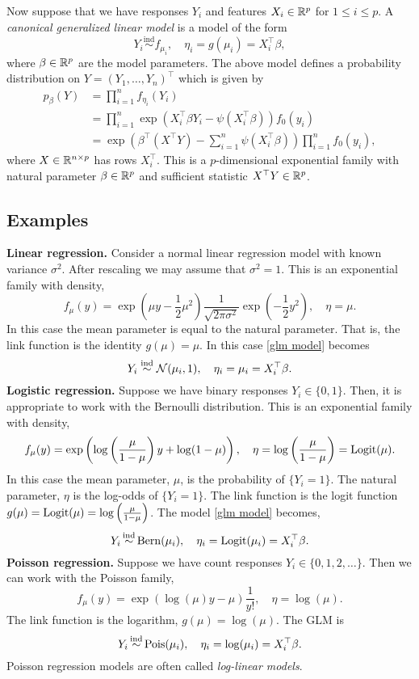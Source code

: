 Now suppose that we have responses $Y_i$ and features $X_i \in \mathbb{R}^p$ for $1\le i \le p$. A \emph{canonical generalized linear model} is a model of the form
\begin{equation}\label{glm model}Y_i \stackrel{\mathrm{ind}}{\sim} f_{\mu_i}, \quad \eta_i=g(\mu_i)= X_i^\top \beta, \end{equation}
where $\beta \in \mathbb{R}^p$ are the model parameters. The above model defines a probability distribution on $Y = (Y_1,\ldots,Y_n)^\top$ which is given by
\begin{align*}
    p_\beta(Y) &= \prod_{i=1}^n f_{\eta_i}(Y_i)\\
    &=\prod_{i=1}^n \exp\left(X_i^\top \beta Y_i - \psi\left(X_i^\top \beta\right)\right) f_0(y_i)\\
    &=\exp\left(\beta^\top (X^\top Y) - \sum_{i=1}^n \psi\left(X_i^\top \beta\right)\right)\prod_{i=1}^n f_0(y_i),
\end{align*}
where $X \in \mathbb{R}^{n \times p}$ has rows $X_i^\top$. This is a $p$-dimensional exponential family with natural parameter $\beta \in \mathbb{R}^p$ and sufficient statistic $X^\top Y \in \mathbb{R}^p$. 

\subsection{Examples} 

{\bf{Linear regression.}} Consider a normal linear regression model with known variance $\sigma^2$. After rescaling we may assume that $\sigma^2 = 1$. This is an exponential family with density,
\[f_\mu(y) = \exp\left(\mu y -\frac{1}{2}\mu^2\right)\frac{1}{\sqrt{2\pi \sigma^2}}\exp\left(-\frac{1}{2}y^2\right), \quad \eta = \mu. \]
In this case the mean parameter is equal to the natural parameter. That is, the link function is the identity $g(\mu) = \mu$. In this case \eqref{glm model} becomes
\[
    Y_i \stackrel{\mathrm{ind}}{\sim} {\mathcal N}(\mu_i, 1), \quad \eta_i = \mu_i = X_i^\top \beta.    
\]
{\bf{Logistic regression.}} Suppose we have binary responses $Y_i \in \{0,1\}$. Then, it is appropriate to work with the Bernoulli distribution. This is an exponential family with density,
\[f_\mu(y) = \exp\left(\log\left(\frac{\mu}{1-\mu}\right)y+\log(1-\mu)\right), \quad \eta = \log\left(\frac{\mu}{1-\mu}\right) = \mathrm{Logit}(\mu).  \]
In this case the mean parameter, $\mu$, is the probability of $\{Y_i=1\}$. The natural parameter, $\eta$ is the log-odds of $\{Y_i = 1\}$. The link function is the logit function $g(\mu) = \mathrm{Logit}(\mu) = \log\left(\frac{\mu}{1-\mu}\right)$. The model \eqref{glm model} becomes,
\[Y_i \simind \mathrm{Bern}(\mu_i), \quad \eta_i = \logit(\mu_i) = X_i^\top \beta. \]
{\bf Poisson regression.} Suppose we have count responses $Y_i \in \{0,1,2,\ldots\}$. Then we can work with the Poisson family,
\[f_\mu(y) = \exp\left(\log(\mu)y -\mu\right) \frac{1}{y!}, \quad \eta = \log(\mu). \]
The link function is the logarithm, $g(\mu) = \log(\mu)$. The GLM is 
\[Y_i \simind \mathrm{Pois}(\mu_i), \quad \eta_i = \log(\mu_i) = X_i^\top \beta. \]
Poisson regression models are often called \emph{log-linear models}. 

